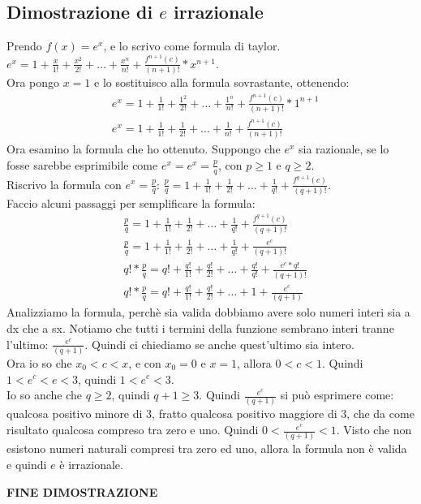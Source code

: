 \documentclass[11pt]{article}
\begin{document}
\subsection{Dimostrazione di $e$ irrazionale}
Prendo $f(x) = e^x$, e lo scrivo come formula di taylor.\\
$e^x = 1 + \frac{x}{1!} + \frac{x^{2}}{2!} + \dots + \frac{x^{n}}{n!} + \frac{f^{n+1}(c)}{(n+1)!}*x^{n+1}$.\\
Ora pongo $x = 1$ e lo sostituisco alla formula sovrastante, ottenendo:\\
\begin{align*}
    &e^x = 1 + \frac{1}{1!} + \frac{1^{2}}{2!} + \dots + \frac{1^{n}}{n!} + \frac{f^{n+1}(c)}{(n+1)!}*1^{n+1}\\
    &e^x = 1 + \frac{1}{1!} + \frac{1}{2!} + \dots + \frac{1}{n!} + \frac{f^{n+1}(c)}{(n+1)!}
\end{align*}
Ora esamino la formula che ho ottenuto. Suppongo che $e^x$ sia razionale, se lo fosse sarebbe esprimibile come $e^x = e^x = \frac{p}{q}$, con $p \ge 1$ e $q \ge 2$.\\
Riscrivo la formula con $e^x = \frac{p}{q}$: $\frac{p}{q} = 1 + \frac{1}{1!} + \frac{1}{2!} + \dots + \frac{1}{q!} + \frac{f^{q+1}(c)}{(q+1)!}$.\\
Faccio alcuni passaggi per semplificare la formula:\\
\begin{align*}
    &\frac{p}{q} = 1 + \frac{1}{1!} + \frac{1}{2!} + \dots + \frac{1}{q!} + \frac{f^{q+1}(c)}{(q+1)!}\\
    &\frac{p}{q} = 1 + \frac{1}{1!} + \frac{1}{2!} + \dots + \frac{1}{q!} + \frac{e^c}{(q+1)!}\\
    &q!*\frac{p}{q} = q! + \frac{q!}{1!} + \frac{q!}{2!} + \dots + \frac{q!}{q!} + \frac{e^c*q!}{(q+1)!}\\
    &q!*\frac{p}{q} = q! + \frac{q!}{1!} + \frac{q!}{2!} + \dots + 1 + \frac{e^c}{(q+1)}
\end{align*}
Analizziamo la formula, perchè sia valida dobbiamo avere solo numeri interi sia a dx che a sx. 
Notiamo che tutti i termini della funzione sembrano interi tranne l'ultimo: $\frac{e^c}{(q+1)}$. Quindi ci chiediamo se anche quest'ultimo sia intero.\\
Ora io so che $x_{0} < c < x$, e con $x_{0} = 0$ e $x = 1$, allora $0 < c < 1$. Quindi $1 < e^c < e < 3$, quindi $1 < e^c < 3$.\\
Io so anche che $q \ge 2$, quindi $q+1 \ge 3$. Quindi $\frac{e^c}{(q+1)}$ si può esprimere come: qualcosa positivo minore di 3, fratto qualcosa positivo maggiore di 3, che 
da come risultato qualcosa compreso tra zero e uno. Quindi $0 < \frac{e^c}{(q+1)} < 1$. Visto che non esistono numeri naturali compresi tra zero ed uno, allora 
la formula non è valida e quindi $e$ è irrazionale.
\begin{center}
    \textbf{FINE DIMOSTRAZIONE}
\end{center}
\end{document}
